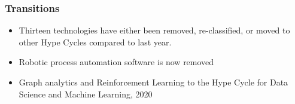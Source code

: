 \begin{frame}[fragile]\frametitle{Transitions}

\begin{itemize}
\item Thirteen technologies have either been removed, re-classified, or moved to other Hype Cycles compared to last year.
\item Robotic process automation software is now removed 
\item Graph analytics and Reinforcement Learning to the Hype Cycle for Data Science and Machine Learning, 2020
\end{itemize}



\end{frame}









